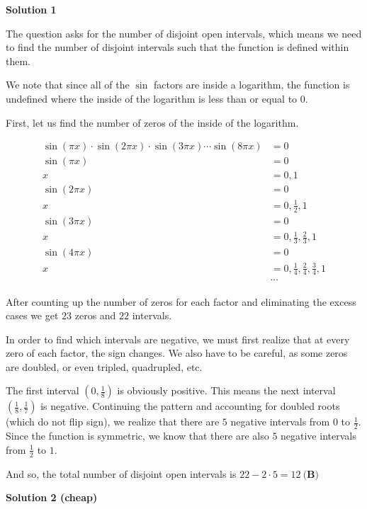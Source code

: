 \begin{enumerate}
\textbf{Solution 1}

The question asks for the number of disjoint open intervals, which means we need to find the number of disjoint intervals such that the function is defined within them.

 We note that since all of the $\sin$ factors are inside a logarithm, the function is undefined where the inside of the logarithm is less than or equal to $0$.

 First, let us find the number of zeros of the inside of the logarithm.

 
 \begin{align*}\sin(\pi x) \cdot \sin(2 \pi x) \cdot \sin (3 \pi x) \cdots \sin(8 \pi x) &= 0\\ \sin(\pi x) &= 0\\ x &= 0, 1\\ \sin(2 \pi x) &= 0\\ x &= 0, \frac{1}{2}, 1\\ \sin(3 \pi x) &= 0\\ x &= 0, \frac{1}{3}, \frac{2}{3}, 1\\ \sin(4 \pi x) &= 0\\ x &= 0, \frac{1}{4}, \frac{2}{4}, \frac{3}{4}, 1\\ &\cdots\end{align*}


 After counting up the number of zeros for each factor and eliminating the excess cases we get $23$ zeros and $22$ intervals.

 In order to find which intervals are negative, we must first realize that at every zero of each factor, the sign changes. We also have to be careful, as some zeros are doubled, or even tripled, quadrupled, etc.

 The first interval $\left(0, \frac{1}{8}\right)$ is obviously positive. This means the next interval $\left(\frac{1}{8}, \frac{1}{7}\right)$ is negative. Continuing the pattern and accounting for doubled roots (which do not flip sign), we realize that there are $5$ negative intervals from $0$ to $\frac{1}{2}$. Since the function is symmetric, we know that there are also $5$ negative intervals from $\frac{1}{2}$ to $1$.

 And so, the total number of disjoint open intervals is $22 - 2\cdot{5} = \boxed{12\ \textbf{(B)}}$




\textbf{Solution 2 (cheap)}


\end{enumerate}
